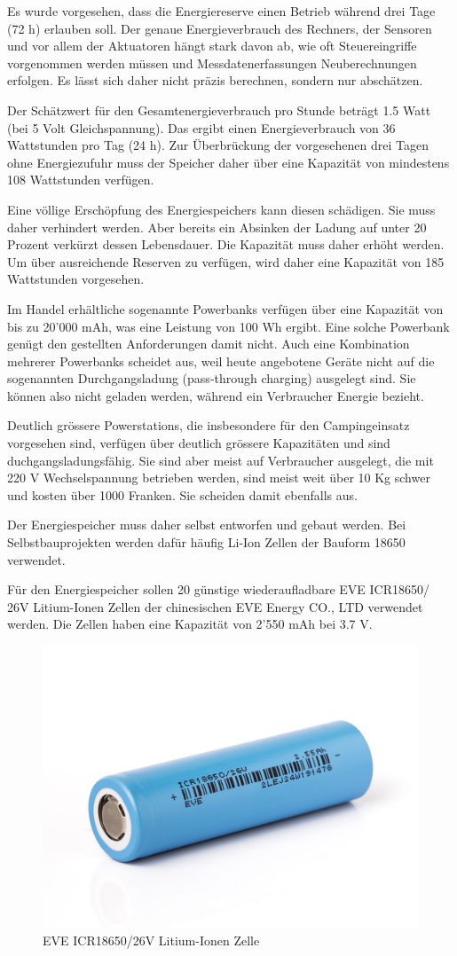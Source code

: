 Es wurde vorgesehen, dass die Energiereserve einen Betrieb während drei Tage (72 h) erlauben soll. Der genaue Energieverbrauch des Rechners, der Sensoren und vor allem der Aktuatoren hängt stark davon ab, wie oft Steuereingriffe vorgenommen werden müssen und Messdatenerfassungen Neuberechnungen erfolgen. Es lässt sich daher nicht präzis berechnen, sondern nur abschätzen.

Der Schätzwert für den Gesamtenergieverbrauch pro Stunde beträgt 1.5 Watt (bei 5 Volt Gleichspannung). Das ergibt einen Energieverbrauch von 36 Wattstunden pro Tag (24 h). Zur Überbrückung der vorgesehenen drei Tagen ohne Energiezufuhr muss der Speicher daher über eine Kapazität von mindestens 108 Wattstunden verfügen. 

Eine völlige Erschöpfung des Energiespeichers kann diesen schädigen. Sie muss daher verhindert werden. Aber bereits ein Absinken der Ladung auf unter 20 Prozent verkürzt dessen Lebensdauer. Die Kapazität muss daher erhöht werden. Um über ausreichende Reserven zu verfügen, wird daher eine Kapazität von 185 Wattstunden vorgesehen.

Im Handel erhältliche sogenannte Powerbanks verfügen über eine Kapazität von bis zu 20'000 mAh, was eine Leistung von 100 Wh ergibt. Eine solche Powerbank genügt den gestellten Anforderungen damit nicht. Auch eine Kombination mehrerer Powerbanks scheidet aus, weil heute angebotene Geräte nicht auf die sogenannten Durchgangsladung (pass‐through charging) ausgelegt sind. Sie können also nicht geladen werden, während ein Verbraucher Energie bezieht.  

Deutlich grössere Powerstations, die insbesondere für den Campingeinsatz vorgesehen sind, verfügen über deutlich grössere Kapazitäten und sind duchgangsladungsfähig. Sie sind aber meist auf Verbraucher ausgelegt, die mit 220 V Wechselspannung betrieben werden, sind meist weit über 10 Kg schwer und kosten über 1000 Franken. Sie scheiden damit ebenfalls aus. 

Der Energiespeicher muss daher selbst entworfen und gebaut werden. Bei Selbstbauprojekten werden dafür häufig Li-Ion Zellen der Bauform 18650 verwendet.

Für den Energiespeicher sollen 20 günstige wiederaufladbare EVE ICR18650/ 26V Litium-Ionen Zellen der chinesischen EVE Energy CO., LTD verwendet werden. Die Zellen haben eine Kapazität von 2'550 mAh bei 3.7 V.
 \begin{figure}
     \centering
     \includegraphics[width=0.5\linewidth]{assets/EVE-ICR18650-26V-3-6V-3-7V-2600mAh-7-5A-Li-Ionen-Akku.jpg}
     \caption{ EVE ICR18650/26V Litium-Ionen Zelle}
     \label{fig:enter-label}
 \end{figure} 
   

